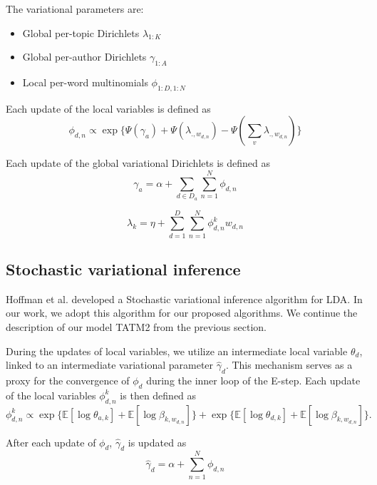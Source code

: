 The variational parameters are:
\begin{itemize}
	\item Global per-topic Dirichlets $\lambda_{1:K}$
	\item Global per-author Dirichlets $\gamma_{1:A}$
	\item Local per-word multinomials $\phi_{1:D,1:N}$
\end{itemize}

Each update of the local variables is defined as
\begin{equation}
\phi_{d,n} \propto \exp \{ \Psi(\gamma_a) + \Psi(\lambda_{.,w_{d,n}}) - \Psi(\sum_{v}{\lambda_{.,w_{d,n}}}) \}
\end{equation}

Each update of the global variational Dirichlets is defined as
\begin{equation}
\gamma_a = \alpha + \sum_{d \in D_a}{\sum_{n=1}^{N}{\phi_{d,n}}}
\end{equation}

\begin{equation}
\lambda_k = \eta + \sum_{d=1}^{D}{\sum_{n=1}^{N}{\phi^k_{d,n}w_{d,n}}}
\end{equation}



\subsection{Stochastic variational inference}


Hoffman et al. \cite{Hoffman10} developed a Stochastic variational inference algorithm for LDA. In our work, we adopt this algorithm for our proposed algorithms. We continue the description of our model TATM2 from the previous section. 

During the updates of local variables, we utilize an intermediate local variable $\theta_{d}$, linked to an intermediate variational parameter $\hat{\gamma}_d$. This mechanism serves as a proxy for the convergence of $\phi_{d}$ during the inner loop of the E-step. Each update of the local variables $\phi^k_{d,n}$ is then defined as
\begin{equation}
\phi^k_{d,n} \propto \exp \{ \mathbb{E}[\log \theta_{a,k}] + \mathbb{E}[\log \beta_{k,w_{d,n}}] \} + \exp \{ \mathbb{E}[\log \theta_{d,k}] + \mathbb{E}[\log \beta_{k,w_{d,n}}] \}.
\end{equation}

After each update of $\phi_{d}$, $\hat{\gamma}_d$ is updated as
\begin{equation}
\hat{\gamma}_d = \alpha + \sum_{n=1}^{N}{\phi_{d,n}}
\end{equation}

